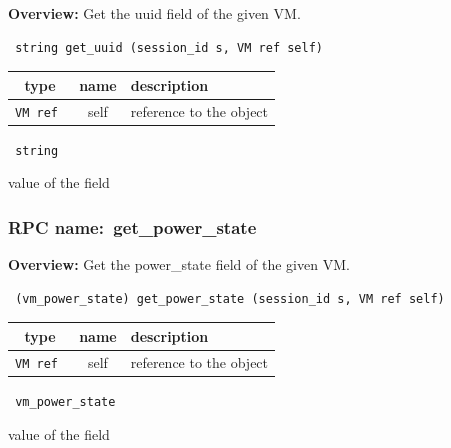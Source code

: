 {\bf Overview:} 
Get the uuid field of the given VM.

\begin{verbatim} string get_uuid (session_id s, VM ref self)\end{verbatim}



 
\vspace{0.3cm}
\begin{tabular}{|c|c|p{7cm}|}
 \hline
{\bf type} & {\bf name} & {\bf description} \\ \hline
{\tt VM ref } & self & reference to the object \\ \hline 

\end{tabular}

\vspace{0.3cm}

{\tt 
string
}


value of the field
\vspace{0.3cm}
\vspace{0.3cm}
\vspace{0.3cm}
\subsubsection{RPC name:~get\_power\_state}

{\bf Overview:} 
Get the power\_state field of the given VM.

\begin{verbatim} (vm_power_state) get_power_state (session_id s, VM ref self)\end{verbatim}



 
\vspace{0.3cm}
\begin{tabular}{|c|c|p{7cm}|}
 \hline
{\bf type} & {\bf name} & {\bf description} \\ \hline
{\tt VM ref } & self & reference to the object \\ \hline 

\end{tabular}

\vspace{0.3cm}

{\tt 
vm\_power\_state
}


value of the field
\vspace{0.3cm}
\vspace{0.3cm}
\vspace{0.3cm}

